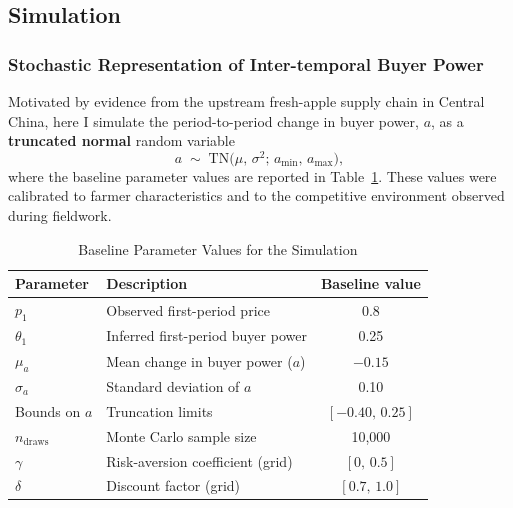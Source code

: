 \subsection{Simulation}

\subsubsection{Stochastic Representation of Inter-temporal Buyer Power}

\noindent
Motivated by evidence from the upstream fresh-apple supply chain in Central China, here I simulate the period-to-period change in buyer power, $a$, as a \textbf{truncated normal} random variable
\[
a \;\sim\; \text{TN}\!\bigl(\mu,\,\sigma^{2};\,a_{\min},\,a_{\max}\bigr),
\]
where the baseline parameter values are reported in Table~\ref{tab:baseline-parameters}.  
These values were calibrated to farmer characteristics and to the competitive environment observed during fieldwork.

\begin{table}[H]
    \centering
    \caption{Baseline Parameter Values for the Simulation}
    \label{tab:baseline-parameters}
    \begin{tabular}{llc}
        \toprule
        \textbf{Parameter} & \textbf{Description} & \textbf{Baseline value} \\ \midrule
        $p_{1}$            & Observed first-period price                        & 0.8   \\
        $\theta_{1}$       & Inferred first-period buyer power                  & 0.25  \\
        $\mu_{a}$          & Mean change in buyer power ($a$)                  & $-0.15$ \\
        $\sigma_{a}$       & Standard deviation of $\!a$                       & 0.10  \\
        Bounds on $a$      & Truncation limits                                  & $[-0.40,\,0.25]$ \\
        $n_{\text{draws}}$ & Monte Carlo sample size                            & 10,000 \\
        $\gamma$           & Risk-aversion coefficient (grid)                   & $[0,\,0.5]$ \\
        $\delta$           & Discount factor (grid)                             & $[0.7,\,1.0]$ \\ \bottomrule
    \end{tabular}
\end{table}

